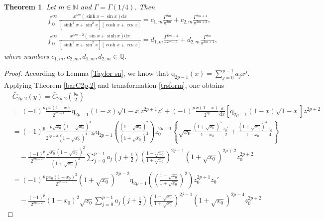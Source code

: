 \documentclass[11pt]{article}
\theoremstyle{plain}
\newtheorem{thm}{Theorem}[section]
\theoremstyle{definition}
\begin{document}
\begin{thm}\label{mixInt1}
Let $m\in \mathbb{N}$ and $\Gamma=\Gamma(1/4)$. Then
\begin{align}
&\int_0^{\infty}{\frac{x^{4m}\left( \sinh x-\sin x \right) \mathrm{d}x}{\left[ \sinh ^2x+\sin ^2x \right] \left[ \cosh x+\cos x \right]}}= c_{1,m} \frac{\Gamma ^{8m}}{\pi ^{2m}}+ c_{2,m}\frac{\Gamma ^{8m+4}}{\pi ^{2m+2}},
\\
&\int_0^{\infty}{\frac{x^{4m-2}\left( \sin x+\sinh x \right) \mathrm{d}x}{\left[ \sinh ^2x+\sin ^2x \right] \left[ \cosh x+\cos x \right]}}= d_{1,m} \frac{\Gamma ^{8m-4}}{\pi ^{2m-1}}+d_{2,m} \frac{\Gamma ^{8m}}{\pi ^{2m+1}},
	\end{align}
	where  numbers $c_{1,m},c_{2,m},d_{1,m},d_{2,m}\in \mathbb{Q}$.
\end{thm}
\begin{proof}
According to  Lemma \ref{Taylor sn},  we know that $\text{q}_{2p-1}(x)=\sum^{p-1}_{j=0}a_jx^j$.
Applying Theorem \ref{barC2p,2} and transformation \eqref{trsform},  one obtains
\begin{align}
&\bar{C}_{2p,2}\left( y\right)=\bar{C}_{2p,2}\left( \frac{y_0}{2} \right)\nonumber\\
& =\left( -1 \right) ^p\frac{px(1-x)}{2^{2p-1}}\mathrm{q}_{2p-1}\left( 1-x \right) \sqrt{1-x}z^{2p+1}z'
	+\left( -1 \right) ^p\frac{x(1-x)}{2^{2p}}\frac{\mathrm{d}}{\mathrm{d}x}\left[ \mathrm{q}_{2p-1}\left( 1-x \right) \sqrt{1-x} \right] z^{2p+2}
		\nonumber\\
		&=
		\left( -1 \right) ^p\frac{p\sqrt{x_0}\left( 1-\sqrt{x_0} \right) ^3}{2^{2p-3}\left( 1+\sqrt{x_0} \right) ^{4-2p}}\mathrm{q}_{2p-1}\left( \frac{\left( 1-\sqrt{x_0} \right) ^2}{\left( 1+\sqrt{x_0} \right) ^2} \right) z_{0}^{2p+1}
\left\{ \sqrt{x_0}\frac{\left( 1+\sqrt{x_0} \right) ^5}{1-x_0}\frac{z_0'}{2}+\frac{\left( 1+\sqrt{x_0} \right) ^4}{1-x_0}\frac{z_0}{4} \right\}
		\nonumber\\
		&\quad -\frac{\left( -1 \right) ^p}{2^{2p-2}}\frac{\sqrt{x_0}\left( 1-\sqrt{x_0} \right) ^2}{\left( 1+\sqrt{x_0} \right) ^4}\sum_{j=0}^{p-1}{a_j}\left( j+\frac{1}{2} \right) \left( \frac{1-\sqrt{x_0}}{1+\sqrt{x_0}} \right) ^{2j-1}\left( 1+\sqrt{x_0} \right) ^{2p+2}z_{0}^{2p+2}
		\nonumber\\
		&=\left( -1 \right) ^p\frac{px_0\left( 1-x_0 \right) ^2}{2^{2p-2}}\left( 1+\sqrt{x_0} \right) ^{2p-2}\mathrm{q}_{2p-1}\left( \left( \frac{1-\sqrt{x_0}}{1+\sqrt{x_0}} \right) ^2 \right) z_{0}^{2p+1}z_0'
		\nonumber\\
		&\quad
		-\frac{\left( -1 \right) ^p}{2^{2p-2}}(1-x_0)^2\sqrt{x_0}\sum_{j=0}^{p-1}{a_j}\left( j+\frac{1}{2} \right) \left( \frac{1-\sqrt{x_0}}{1+\sqrt{x_0}} \right) ^{2j-1}\left( 1+\sqrt{x_0} \right) ^{2p-4}z_{0}^{2p+2}

\end{align}
\end{proof}
\end{document}
